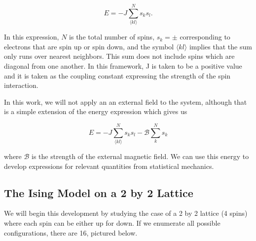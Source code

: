 \documentclass[%
oneside,                 %
final,                   %
10pt]{article}
\begin{document}
\begin{equation*}
E=-J \sum_{\langle k l \rangle}^N s_k s_l.
\end{equation*}

In this expression, $N$ is the total number of spins, $s_k = \pm$ corresponding to electrons that are spin up or spin down, and the symbol $ \langle kl \rangle$ implies that the sum only runs over nearest neighbors.  This sum does not include spins which are diagonal from one another.  In this framework, J is taken to be a positive value and it is taken as the coupling constant expressing the strength of the spin interaction.

In this work, we will not apply an an external field to the system, although that is a simple extension of the energy expression which gives us

\begin{equation*}
E=-J \sum_{\langle k l \rangle}^N s_k s_l - \mathcal{B} \sum_k^N s_k
\end{equation*}

where $\mathcal{B}$ is the strength of the external magnetic field. We can use this energy to develop expressions for relevant quantities from statistical mechanics.

\subsection{The Ising Model on a 2 by 2 Lattice}

We will begin this development by studying the case of a 2 by 2 lattice (4 spins) where each spin can be either up for down.  If we enumerate all possible configurations, there are 16, pictured below.
\end{document}
